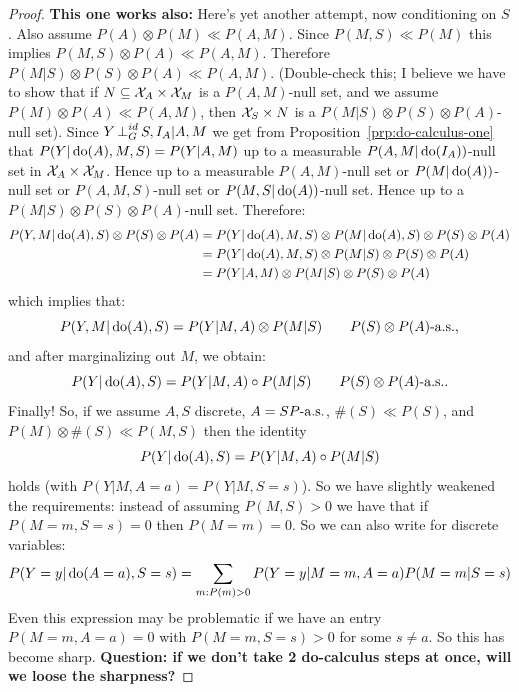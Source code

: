 \begin{proof}
\textbf{This one works also:}
Here's yet another attempt, now conditioning on $S$.
Also assume $P(A) \otimes P(M) \ll P(A,M)$.
Since $P(M,S) \ll P(M)$ this implies $P(M,S) \otimes P(A) \ll P(A,M)$.
Therefore $P(M|S) \otimes P(S) \otimes P(A) \ll P(A,M)$.
(Double-check this; I believe we have to show that if $N \subseteq \mathcal{X}_A \times \mathcal{X}_M$ is a $P(A,M)$-null set, and we assume $P(M) \otimes P(A) \ll P(A,M)$, 
then $\mathcal{X}_S \times N$ is a $P(M|S) \otimes P(S) \otimes P(A)$-null set).
Since $Y \operatorname*{\perp}^{id}_G S,I_A | A,M$ we get from Proposition~\ref{prp:do-calculus-one} that $P(Y|\operatorname{do}(A),M,S) = P(Y|A,M)$ up to a measurable $P(A,M|\operatorname{do}(I_A))$-null set in $\mathcal{X}_A\times\mathcal{X}_M$.
Hence up to a measurable $P(A,M)$-null set or $P(M|\operatorname{do}(A))$-null set or $P(A,M,S)$-null set or $P(M,S|\operatorname{do}(A))$-null set. 
Hence up to a $P(M|S) \otimes P(S) \otimes P(A)$-null set.
Therefore:
\begin{equation*}\begin{split}
    P(Y,M|\operatorname{do}(A),S) \otimes P(S) \otimes P(A)
 &= P(Y|\operatorname{do}(A),M,S) \otimes P(M|\operatorname{do}(A),S) \otimes P(S) \otimes P(A) \\
 &= P(Y|\operatorname{do}(A),M,S) \otimes P(M|S) \otimes P(S) \otimes P(A) \\
 &= P(Y|A,M) \otimes P(M|S) \otimes P(S) \otimes P(A)
\end{split}\end{equation*}
which implies that:
\begin{equation*}
  P(Y,M|\operatorname{do}(A),S) = P(Y | M,A) \otimes P(M|S) \qquad P(S) \otimes P(A)\text{-a.s.},
\end{equation*}
and after marginalizing out $M$, we obtain:
\begin{equation*}
  P(Y|\operatorname{do}(A),S) = P(Y | M,A) \circ P(M|S) \qquad P(S)\otimes P(A)\text{-a.s.}.
\end{equation*}
Finally!
So, if we assume $A,S$ discrete, $A=S P\text{-a.s.}$, $\#(S) \ll P(S)$, and $P(M) \otimes \#(S) \ll P(M,S)$ then the identity
\begin{equation*}
  P(Y|\operatorname{do}(A),S) = P(Y | M,A) \circ P(M|S)
\end{equation*}
holds (with $P(Y|M,A=a)=P(Y|M,S=s)$).
So we have slightly weakened the requirements: instead of assuming $P(M,S) > 0$ we have that if $P(M=m,S=s) = 0$ then $P(M=m)=0$.
So we can also write for discrete variables:
\begin{equation*}
  P(Y=y|\operatorname{do}(A=a),S=s) = \sum_{m : P(m) > 0} P(Y=y | M=m,A=a) P(M=m|S=s)
\end{equation*}
Even this expression may be problematic if we have an entry $P(M=m,A=a)=0$ with $P(M=m,S=s)>0$ for some $s\ne a$.
So this has become sharp.
\textbf{Question: if we don't take 2 do-calculus steps at once, will we loose the sharpness?}


\end{proof}

